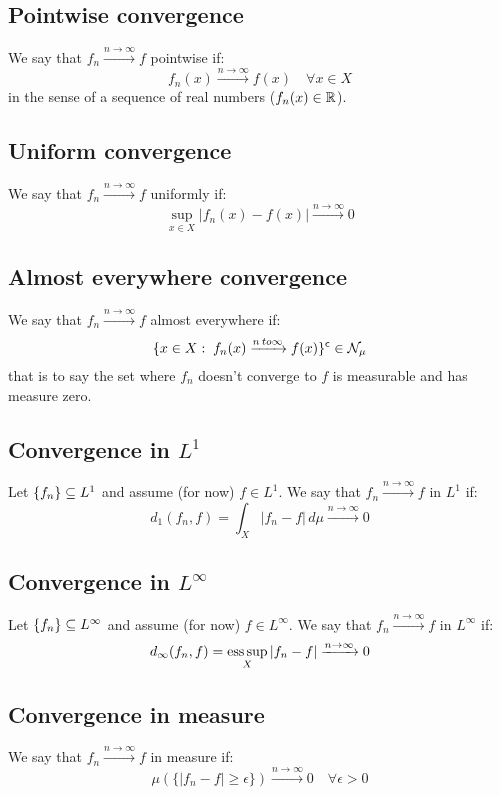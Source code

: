 \subsection{Pointwise convergence}
We say that $f_n \xrightarrow{n\to\infty} f$ pointwise if:
\[
    f_n(x) \xrightarrow{n\to\infty} f(x) \quad \forall x \in X
\]
in the sense of a sequence of real numbers ($f_n(x)\in\R$).

\subsection{Uniform convergence}
We say that $f_n \xrightarrow{n\to\infty} f$ uniformly if:
\[
    \sup_{x\in X} |f_n(x)-f(x)| \xrightarrow{n\to\infty} 0
\]

\subsection{Almost everywhere convergence}
We say that $f_n \xrightarrow{n\to\infty} f$ almost everywhere if:
\[
    \{ x\in X : \; f_n(x) \xrightarrow{n\\to\infty} f(x) \}^\complement \in \mathcal{N}_\mu
\]
that is to say the set where $f_n$ doesn't converge to $f$ is measurable and has measure zero.

\subsection{Convergence in \texorpdfstring{$L^1$}{L1}}
Let $\seq{f}\subseteq L^1$ and assume (for now) $f\in L^1$. We say that $f_n \xrightarrow{n\to\infty} f$ in $L^1$ if:
\[
    d_1(f_n,f) = \int_X |f_n-f| \, d\mu \xrightarrow{n\to\infty} 0    
\]

\subsection{Convergence in \texorpdfstring{$L^\infty$}{Linf}}
Let $\seq{f}\subseteq L^\infty$ and assume (for now) $f\in L^\infty$. We say that $f_n \xrightarrow{n\to\infty} f$ in $L^\infty$ if:
\[
    d_\infty(f_n,f) = \esssup_X |f_n-f| \xrightarrow{n\to\infty} 0
\]

\subsection{Convergence in measure}\label{conv:meas}
We say that $f_n \xrightarrow{n\to\infty} f$ in measure if:
\[
    \mu (\{ |f_n-f| \geq \epsilon \}) \xrightarrow{n\to\infty} 0 \quad \forall \epsilon > 0   
\]
